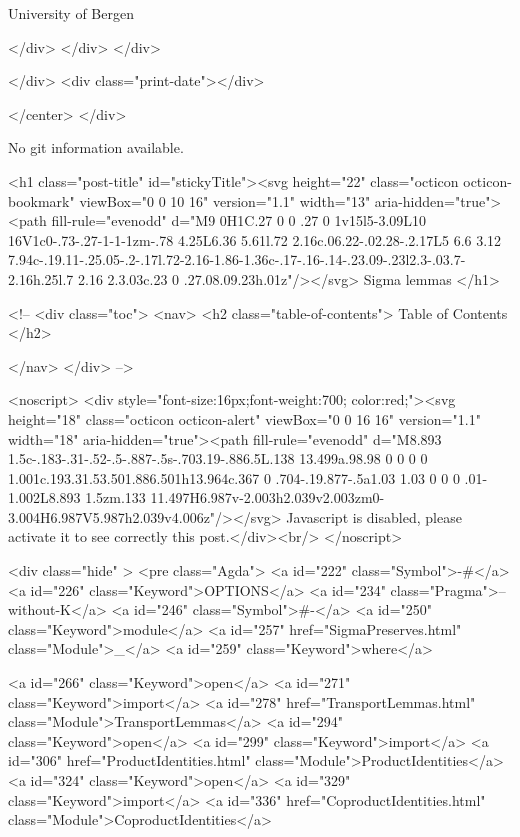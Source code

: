                   University of Bergen
                
                </div>
            </div>
          </div>
          
          
        </div>
        <div class="print-date"></div>
        
        
    </center>
  </div>

  
  No git information available.
  
  <h1 class="post-title" id="stickyTitle"><svg height="22" class="octicon octicon-bookmark" viewBox="0 0 10 16" version="1.1" width="13" aria-hidden="true"><path fill-rule="evenodd" d="M9 0H1C.27 0 0 .27 0 1v15l5-3.09L10 16V1c0-.73-.27-1-1-1zm-.78 4.25L6.36 5.61l.72 2.16c.06.22-.02.28-.2.17L5 6.6 3.12 7.94c-.19.11-.25.05-.2-.17l.72-2.16-1.86-1.36c-.17-.16-.14-.23.09-.23l2.3-.03.7-2.16h.25l.7 2.16 2.3.03c.23 0 .27.08.09.23h.01z"/></svg> Sigma lemmas
  </h1>

  <!-- 
  <div class="toc">
    <nav>
    <h2 class="table-of-contents"> Table of Contents </h2>
      

    </nav>
  </div>
   -->

  <noscript>
  <div style="font-size:16px;font-weight:700; color:red;"><svg height="18" class="octicon octicon-alert" viewBox="0 0 16 16" version="1.1" width="18" aria-hidden="true"><path fill-rule="evenodd" d="M8.893 1.5c-.183-.31-.52-.5-.887-.5s-.703.19-.886.5L.138 13.499a.98.98 0 0 0 0 1.001c.193.31.53.501.886.501h13.964c.367 0 .704-.19.877-.5a1.03 1.03 0 0 0 .01-1.002L8.893 1.5zm.133 11.497H6.987v-2.003h2.039v2.003zm0-3.004H6.987V5.987h2.039v4.006z"/></svg> Javascript is disabled, please activate it to see correctly this post.</div><br/>
  </noscript>

  <div class="hide" >
<pre class="Agda">
<a id="222" class="Symbol">{-#</a> <a id="226" class="Keyword">OPTIONS</a> <a id="234" class="Pragma">--without-K</a> <a id="246" class="Symbol">#-}</a>
<a id="250" class="Keyword">module</a> <a id="257" href="SigmaPreserves.html" class="Module">_</a> <a id="259" class="Keyword">where</a>

<a id="266" class="Keyword">open</a> <a id="271" class="Keyword">import</a> <a id="278" href="TransportLemmas.html" class="Module">TransportLemmas</a>
<a id="294" class="Keyword">open</a> <a id="299" class="Keyword">import</a> <a id="306" href="ProductIdentities.html" class="Module">ProductIdentities</a>
<a id="324" class="Keyword">open</a> <a id="329" class="Keyword">import</a> <a id="336" href="CoproductIdentities.html" class="Module">CoproductIdentities</a>

